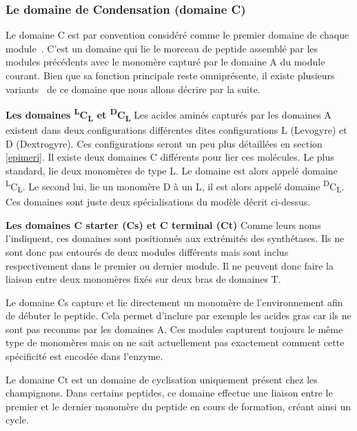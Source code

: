 \subsubsection{Le domaine de Condensation (domaine C)}
Le domaine C est par convention considéré comme le premier domaine de chaque module~\cite{stachelhaus_peptide_1998}.
C'est un domaine qui lie le morceau de peptide assemblé par les modules précédents avec le monomère capturé par le domaine A du module courant.
Bien que sa fonction principale reste omniprésente, il existe plusieurs variants~\cite{rausch_phylogenetic_2007} de ce domaine que nous allons décrire par la suite.

\textbf{Les domaines \textsuperscript{L}C\textsubscript{L} et \textsuperscript{D}C\textsubscript{L}}
Les acides aminés capturés par les domaines A existent dans deux configurations différentes dites configurations L (Levogyre) et D (Dextrogyre).
Ces configurations seront un peu plus détaillées en section \ref{epimeri}.
Il existe deux domaines C différents pour lier ces molécules.
Le plus standard, lie deux monomères de type L. Le domaine est alors appelé domaine \textsuperscript{L}C\textsubscript{L}.
Le second lui, lie un monomère D à un L, il est alors appelé domaine \textsuperscript{D}C\textsubscript{L}.
Ces domaines sont juste deux spécialisations du modèle décrit ci-dessus.

\textbf{Les domaines C starter (Cs) et C terminal (Ct)}
Comme leurs noms l'indiquent, ces domaines sont positionnés aux extrémités des synthétases.
Ils ne sont donc pas entourés de deux modules différents mais sont inclus respectivement dans le premier ou dernier module.
Il ne peuvent donc faire la liaison entre deux monomères fixés sur deux bras de domaines T.

Le domaine Cs capture et lie directement un monomère de l'environnement afin de débuter le peptide.
Cela permet d'inclure par exemple les acides gras car ils ne sont pas reconnus par les domaines A.
Ces modules capturent toujours le même type de monomères mais on ne sait actuellement pas exactement comment cette spécificité est encodée dans l'enzyme.

Le domaine Ct est un domaine de cyclisation uniquement présent chez les champignons.
Dans certains peptides, ce domaine effectue une liaison entre le premier et le dernier monomère du peptide en cours de formation, créant ainsi un cycle\cite{gao_cyclization_2012}.


